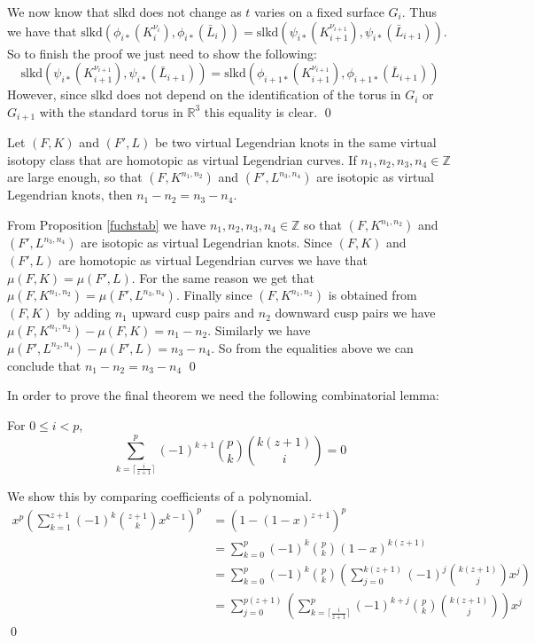 We now know that $\text{slkd}$ does not change as $t$ varies on a fixed surface $G_i$.  Thus we have that $\text{slkd}(\phi_{i*}(K_i^{\nu_i}), \phi_{i*}(\bar{L}_i)) = \text{slkd}(\psi_{i*}(K_{i+1}^{\nu_{i+1}}), \psi_{i*}(\bar{L}_{i+1}))$.  So to finish the proof we just need to show the following: 
$$\text{slkd}(\psi_{i*}(K_{i+1}^{\nu_{i+1}}), \psi_{i*}(\bar{L}_{i+1})) = \text{slkd}(\phi_{i+1*}(K_{i+1}^{\nu_{i+1}}), \phi_{i+1*}(\bar{L}_{i+1}))$$
However, since $\text{slkd}$ does not depend on the identification of the torus in $G_i$ or $G_{i+1}$ with the standard torus in $\mathbb{R}^3$ this equality is clear.
\qed





\begin{thm}\label{samemaslov}
Let $(F, K)$ and $(F', L)$ be two virtual Legendrian knots in the same virtual isotopy class that are homotopic as virtual Legendrian curves. If $n_1, n_2, n_3, n_4 \in \mathbb{Z}$ are large enough, so that $(F, K^{n_1,n_2})$ and $(F',L^{n_3, n_4})$ are isotopic as virtual Legendrian knots, then $n_1-n_2 = n_3-n_4$.
\end{thm}

\pp
From Proposition \ref{fuchstab} we have $n_1, n_2, n_3, n_4\in\mathbb{Z}$ so that $(F, K^{n_1,n_2})$ and $(F',L^{n_3, n_4})$ are isotopic as virtual Legendrian knots.  Since $(F, K)$ and $(F', L)$ are homotopic as virtual Legendrian curves we have that $\mu(F, K)=\mu(F', L)$.  For the same reason we get that $\mu(F, K^{n_1, n_2})=\mu(F', L^{n_3,n_4})$.  Finally since $(F, K^{n_1,n_2})$ is obtained from $(F, K)$ by adding $n_1$ upward cusp pairs and $n_2$ downward cusp pairs we have $\mu(F, K^{n_1,n_2})-\mu(F, K) = n_1 - n_2$.  Similarly we have $\mu(F', L^{n_3,n_4})-\mu(F', L)=n_3-n_4$.  So from the equalities above we can conclude that $n_1-n_2=n_3-n_4$
\qed

In order to prove the final theorem we need the following combinatorial lemma:

\begin{lem} \label{comboLem}
For $0\leq i < p$,
$$\sum_{k=\lceil\frac{i}{z+1}\rceil}^p (-1)^{k+1}\binom{p}{k}\binom{k(z+1)}{i} = 0$$
\end{lem}
\pp
We show this by comparing coefficients of a polynomial.
\begin{align*}
x^p\left(\sum_{k=1}^{z+1}(-1)^k\binom{z+1}{k}x^{k-1}\right)^p &= (1-(1-x)^{z+1})^p\\
 &= \sum_{k=0}^p (-1)^k\binom{p}{k}(1-x)^{k(z+1)}\\
 &= \sum_{k=0}^p (-1)^k\binom{p}{k}\left( \sum_{j=0}^{k(z+1)}(-1)^j\binom{k(z+1)}{j}x^j \right)\\
 &= \sum_{j=0}^{p(z+1)} \left( \sum_{k=\lceil\frac{i}{z+1}\rceil}^p (-1)^{k+j}\binom{p}{k}\binom{k(z+1)}{j} \right) x^j
\end{align*}
\qed

